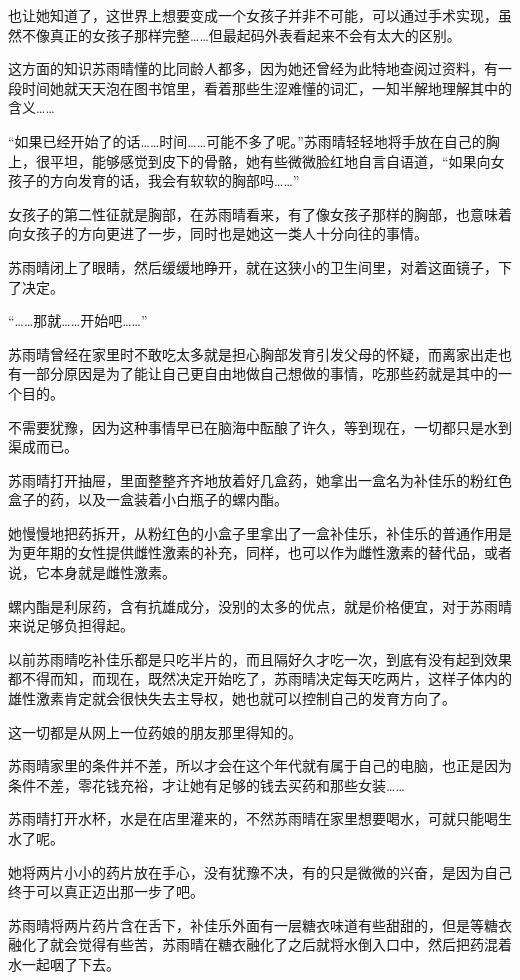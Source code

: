 也让她知道了，这世界上想要变成一个女孩子并非不可能，可以通过手术实现，虽然不像真正的女孩子那样完整……但最起码外表看起来不会有太大的区别。

这方面的知识苏雨晴懂的比同龄人都多，因为她还曾经为此特地查阅过资料，有一段时间她就天天泡在图书馆里，看着那些生涩难懂的词汇，一知半解地理解其中的含义……

“如果已经开始了的话……时间……可能不多了呢。”苏雨晴轻轻地将手放在自己的胸上，很平坦，能够感觉到皮下的骨骼，她有些微微脸红地自言自语道，“如果向女孩子的方向发育的话，我会有软软的胸部吗……”

女孩子的第二性征就是胸部，在苏雨晴看来，有了像女孩子那样的胸部，也意味着向女孩子的方向更进了一步，同时也是她这一类人十分向往的事情。

苏雨晴闭上了眼睛，然后缓缓地睁开，就在这狭小的卫生间里，对着这面镜子，下了决定。

“……那就……开始吧……”

苏雨晴曾经在家里时不敢吃太多就是担心胸部发育引发父母的怀疑，而离家出走也有一部分原因是为了能让自己更自由地做自己想做的事情，吃那些药就是其中的一个目的。

不需要犹豫，因为这种事情早已在脑海中酝酿了许久，等到现在，一切都只是水到渠成而已。

苏雨晴打开抽屉，里面整整齐齐地放着好几盒药，她拿出一盒名为补佳乐的粉红色盒子的药，以及一盒装着小白瓶子的螺内酯。

她慢慢地把药拆开，从粉红色的小盒子里拿出了一盒补佳乐，补佳乐的普通作用是为更年期的女性提供雌性激素的补充，同样，也可以作为雌性激素的替代品，或者说，它本身就是雌性激素。

螺内酯是利尿药，含有抗雄成分，没别的太多的优点，就是价格便宜，对于苏雨晴来说足够负担得起。

以前苏雨晴吃补佳乐都是只吃半片的，而且隔好久才吃一次，到底有没有起到效果都不得而知，而现在，既然决定开始吃了，苏雨晴决定每天吃两片，这样子体内的雄性激素肯定就会很快失去主导权，她也就可以控制自己的发育方向了。

这一切都是从网上一位药娘的朋友那里得知的。

苏雨晴家里的条件并不差，所以才会在这个年代就有属于自己的电脑，也正是因为条件不差，零花钱充裕，才让她有足够的钱去买药和那些女装……

苏雨晴打开水杯，水是在店里灌来的，不然苏雨晴在家里想要喝水，可就只能喝生水了呢。

她将两片小小的药片放在手心，没有犹豫不决，有的只是微微的兴奋，是因为自己终于可以真正迈出那一步了吧。

苏雨晴将两片药片含在舌下，补佳乐外面有一层糖衣味道有些甜甜的，但是等糖衣融化了就会觉得有些苦，苏雨晴在糖衣融化了之后就将水倒入口中，然后把药混着水一起咽了下去。

